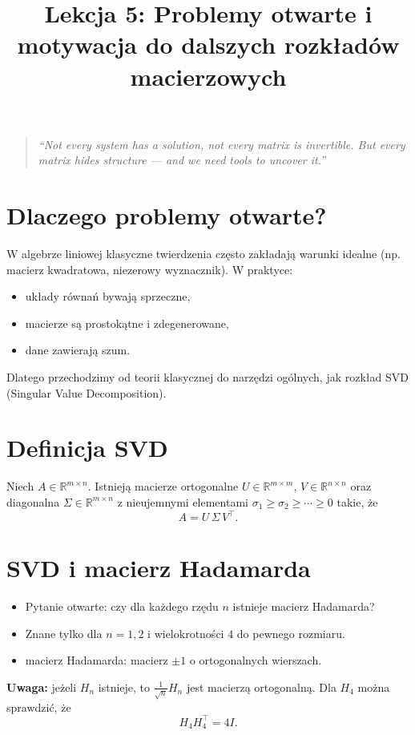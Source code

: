\documentclass[12pt]{article}
\title{Lekcja 5: Problemy otwarte i motywacja do dalszych rozkładów macierzowych}
\author{}
\date{}
\begin{document}
\maketitle

\begin{quote}
\emph{“Not every system has a solution, not every matrix is invertible. 
But every matrix hides structure — and we need tools to uncover it.”}
\end{quote}

\section*{Dlaczego problemy otwarte?}
W algebrze liniowej klasyczne twierdzenia często zakładają warunki idealne 
(np. macierz kwadratowa, niezerowy wyznacznik). 
W praktyce:
\begin{itemize}
  \item układy równań bywają sprzeczne,
  \item macierze są prostokątne i zdegenerowane,
  \item dane zawierają szum.
\end{itemize}
Dlatego przechodzimy od teorii klasycznej do narzędzi ogólnych, 
jak rozkład SVD (Singular Value Decomposition).

\section*{Definicja SVD}
Niech \(A\in\mathbb{R}^{m\times n}\). Istnieją macierze ortogonalne 
\(U\in\mathbb{R}^{m\times m}\), \(V\in\mathbb{R}^{n\times n}\)
oraz diagonalna \(\Sigma\in\mathbb{R}^{m\times n}\) z nieujemnymi elementami
\(\sigma_1\ge \sigma_2\ge \cdots \ge 0\) takie, że
\[
A=U\,\Sigma\,V^\top.
\]

\section{  SVD i macierz Hadamarda}
\begin{itemize}
  \item Pytanie otwarte: czy dla każdego rzędu $n$ istnieje macierz Hadamarda?
  \item Znane tylko dla $n=1,2$ i wielokrotności $4$ do pewnego rozmiaru.
  \item macierz Hadamarda: macierz $\pm1$ o ortogonalnych wierszach.
\end{itemize}

\textbf{Uwaga:} jeżeli \(H_n\) istnieje, to \(\tfrac{1}{\sqrt{n}}H_n\) jest macierzą ortogonalną.  
Dla \(H_4\) można sprawdzić, że
\[
H_4H_4^\top = 4I.
\]
\end{document}
